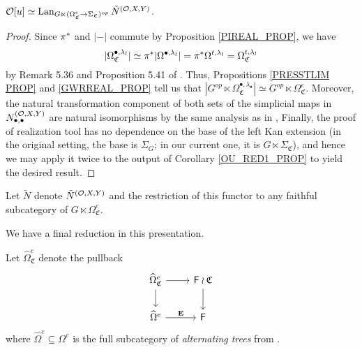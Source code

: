\documentclass[a4paper,10pt
,draft
]{article}%
\renewcommand{\hat}{\widehat}
\renewcommand{\1}{\eta}%
\newcommand{\SC}{\Sigma_{\mathfrak C}}
\newcommand{\OC}{\Omega_{\mathfrak C}}
\begin{document}
\begin{proposition}
      \label{OU_RED2_PROP}
      $\O[u] \simeq \Lan_{G \ltimes (\OC^{e} \to \SC)^{op}} \tilde N^{(\O,X,Y)}$.
\end{proposition}
\begin{proof}
      Since $\pi^{\**}$ and $|-|$ commute by Proposition \ref{PIREAL_PROP},
      we have
      \[
            |\OC^{\bullet, \lambda_l}| \simeq \pi^{\**} |\Omega^{\bullet, \lambda_l}| = \pi^{\**} \Omega^{t, \lambda_l} = \OC^{t, \lambda_l}
      \]
      by Remark 5.36 and Proposition 5.41 of \cite{BP_geo}.
      Thus, Propositions \ref{PRESSTLIM PROP} and \ref{GWRREAL_PROP} tell us that
      $|G^{op} \ltimes \OC^{\bullet, \lambda_\bullet}| \simeq G^{op} \ltimes \OC^e$.
      Moreover, the natural transformation component of both sets of the simplicial maps in $N_{\bullet, \bullet}^{(\mathcal{O},X,Y)}$ are natural isomorphisms by the same analysis as in \cite{BP_geo},
      Finally, the proof of realization tool \cite[Prop. 5.37]{BP_geo} has no dependence on the base of the left Kan extension
      (in the original setting, the base is $\Sigma_G$; in our current one, it is $G \ltimes \Sigma_{\mathfrak C}$),
      and hence we may apply it twice to the output of Corollary \ref{OU_RED1_PROP} to yield the desired result.
\end{proof}

\begin{notation}
      Let $\tilde N$ denote $\tilde N^{(\mathcal{O},X,Y)}$ and the restriction of this functor to any faithful subcategory of $G \ltimes \OC^e$.
\end{notation}

We have a final reduction in this presentation.
\begin{definition}
      Let $\hat\Omega_{\mathfrak C}^e$ denote the pullback
      \[
            \begin{tikzcd}
                  \hat\Omega_{\mathfrak C}^e \arrow[r] \arrow[d]
                  &
                  \Fin \wr \mathfrak C \arrow[d]
                  \\
                  \hat\Omega^e \arrow[r, "\mathbf E"]
                  &
                  \Fin
            \end{tikzcd}
      \]
      where $\hat\Omega^e \subseteq \Omega^e$ is the full subcategory of \textit{alternating trees} from \cite[Defn. 5.48]{BP_geo}.    
\end{definition}
\end{document}
